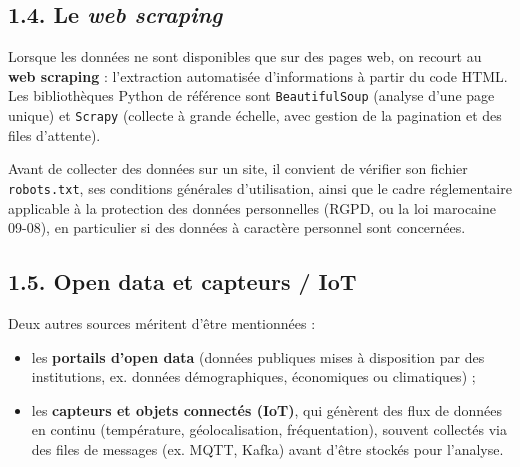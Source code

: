 \documentclass[
  french,
  letterpaper,
  open=any]{scrbook}
\providecommand{\tightlist}{%
  \setlength{\itemsep}{0pt}\setlength{\parskip}{0pt}}
\theoremstyle{definition}
\theoremstyle{definition}
\theoremstyle{remark}
\begin{document}
\subsection{\texorpdfstring{1.4. Le \emph{web
scraping}}{1.4. Le web scraping}}\label{le-web-scraping}

Lorsque les données ne sont disponibles que sur des pages web, on
recourt au \textbf{web scraping} : l'extraction automatisée
d'informations à partir du code HTML. Les bibliothèques Python de
référence sont \texttt{BeautifulSoup} (analyse d'une page unique) et
\texttt{Scrapy} (collecte à grande échelle, avec gestion de la
pagination et des files d'attente).

\begin{tcolorbox}[enhanced jigsaw, arc=.35mm, bottomrule=.15mm, bottomtitle=1mm, breakable, colback=white, colbacktitle=quarto-callout-warning-color!10!white, colframe=quarto-callout-warning-color-frame, coltitle=black, left=2mm, leftrule=.75mm, opacityback=0, opacitybacktitle=0.6, rightrule=.15mm, title=\textcolor{quarto-callout-warning-color}{\faExclamationTriangle}\hspace{0.5em}{Éthique et légalité du web scraping}, titlerule=0mm, toprule=.15mm, toptitle=1mm]

Avant de collecter des données sur un site, il convient de vérifier son
fichier \texttt{robots.txt}, ses conditions générales d'utilisation,
ainsi que le cadre réglementaire applicable à la protection des données
personnelles (RGPD, ou la loi marocaine 09-08), en particulier si des
données à caractère personnel sont concernées.

\end{tcolorbox}

\subsection{1.5. Open data et capteurs /
IoT}\label{open-data-et-capteurs-iot}

Deux autres sources méritent d'être mentionnées :

\begin{itemize}
\tightlist
\item
  les \textbf{portails d'open data} (données publiques mises à
  disposition par des institutions, ex. données démographiques,
  économiques ou climatiques) ;
\item
  les \textbf{capteurs et objets connectés (IoT)}, qui génèrent des flux
  de données en continu (température, géolocalisation, fréquentation),
  souvent collectés via des files de messages (ex. MQTT, Kafka) avant
  d'être stockés pour l'analyse.
\end{itemize}
\end{document}
